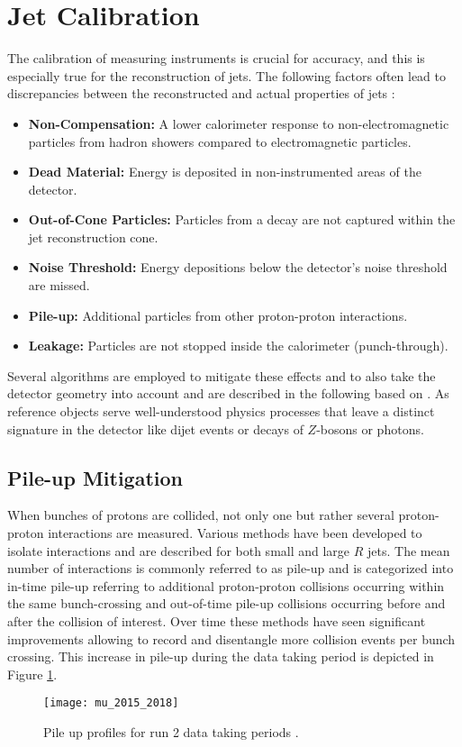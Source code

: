 \section{Jet Calibration}\label{sec:calibration}
The calibration of measuring instruments is crucial for accuracy, and this is especially true for the reconstruction of jets. The following factors often lead to discrepancies between the reconstructed and actual properties of jets \citep{atlas2011jet}:
\begin{itemize}
  \item \textbf{Non-Compensation:} A lower calorimeter response to non-electromagnetic particles from hadron showers compared to electromagnetic particles.
  \item \textbf{Dead Material:} Energy is deposited in non-instrumented areas of the detector.
  \item \textbf{Out-of-Cone Particles:} Particles from a decay are not captured within the jet reconstruction cone.
  \item \textbf{Noise Threshold:} Energy depositions below the detector's noise threshold are missed.
  \item \textbf{Pile-up:} Additional particles from other proton-proton interactions.
  \item \textbf{Leakage:} Particles are not stopped inside the calorimeter (punch-through).
\end{itemize}
Several algorithms are employed to mitigate these effects and to also take the detector geometry into account and are described in the following based on \citep{atlas2021jet}. As reference objects serve well-understood physics processes that leave a distinct signature in the detector like dijet events or decays of $Z$-bosons or photons.

\subsection{Pile-up Mitigation}
When bunches of protons are collided, not only one but rather several proton-proton interactions are measured. Various methods have been developed to isolate interactions and are described for both small and large $R$ jets. The mean number of interactions is commonly referred to as pile-up and is categorized into in-time pile-up referring to additional proton-proton collisions occurring within the same bunch-crossing and out-of-time pile-up collisions occurring before and after the collision of interest. Over time these methods have seen significant improvements allowing to record and disentangle more collision events per bunch crossing. This increase in pile-up during the data taking period is depicted in Figure \ref{fig:pileup}.
\begin{figure}
  \centering
  \texttt{[image: mu\_2015\_2018]}
  \caption[]{Pile up profiles for run 2 data taking periods \citep{pileup}.}
  \label{fig:pileup}
\end{figure}


